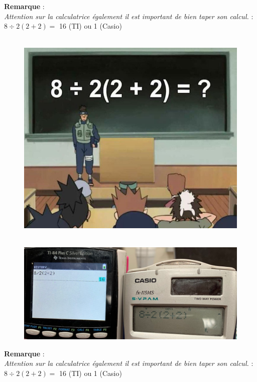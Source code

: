 \documentclass[11pt]{article}
\begin{document}
\newpage

\textbf{Remarque} : \\
\textit{Attention sur la calculatrice également il est important de bien taper son calcul. } : $8 \div 2(2+2) =$ 16 (TI) ou 1 (Casio)

\begin{minipage}[t]{0.5\textwidth}
  \begin{figure}[H]
        \centering
        \includegraphics[width=0.7\linewidth]{5x1-calculer/naruto.png}
  \end{figure}
\end{minipage}
\begin{minipage}[t]{0.5\textwidth}
  \begin{figure}[H]
        \centering
        \includegraphics[width=\linewidth]{5x1-calculer/calc.png}
  \end{figure}
\end{minipage}


\textbf{Remarque} : \\
\textit{Attention sur la calculatrice également il est important de bien taper son calcul. } : $8 \div 2(2+2) =$ 16 (TI) ou 1 (Casio)
\end{document}
